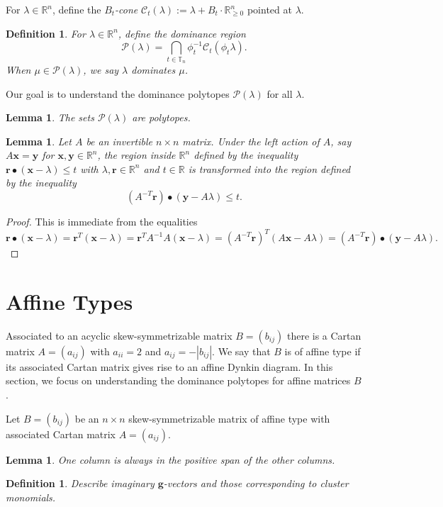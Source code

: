 \documentclass{amsart}
\newtheorem{definition}[theorem]{Definition}
\newtheorem{lemma}[theorem]{Lemma}
\numberwithin{theorem}{section}
\newcommand{\bfg}{\boldsymbol{g}}
\newcommand{\bfr}{\boldsymbol{r}}
\newcommand{\bfx}{\boldsymbol{x}}
\newcommand{\bfy}{\boldsymbol{y}}
\newcommand{\cC}{\mathcal{C}}
\newcommand{\cP}{\mathcal{P}}
\newcommand{\RR}{\mathbb{R}}
\newcommand{\TT}{\mathbb{T}}
\begin{document}
  For $\lambda\in\RR^n$, define the \emph{$B_t$-cone} $\cC_t(\lambda):=\lambda+B_t\cdot\RR_{\ge0}^n$ pointed at $\lambda$.
  \begin{definition}
    For $\lambda\in\RR^n$, define the \emph{dominance region} 
    \[ \cP(\lambda) = \bigcap_{t\in\TT_n} \phi_t^{-1} \cC_t(\phi_t \lambda). \]
    When $\mu\in\cP(\lambda)$, we say \emph{$\lambda$ dominates $\mu$}.
  \end{definition}
  Our goal is to understand the dominance polytopes $\cP(\lambda)$ for all $\lambda$.
  \begin{lemma}
    The sets $\cP(\lambda)$ are polytopes.
  \end{lemma}


  \begin{lemma}
    \label{le:transformed inequalities}
    Let $A$ be an invertible $n\times n$ matrix.
    Under the left action of $A$, say $A\bfx=\bfy$ for $\bfx,\bfy\in\RR^n$, the region inside $\RR^n$ defined by the inequality $\bfr\bullet(\bfx-\lambda)\le t$ with $\lambda,\bfr\in\RR^n$ and $t\in\RR$ is transformed into the region defined by the inequality \[(A^{-T}\bfr)\bullet(\bfy-A\lambda)\le t.\]
  \end{lemma}
  \begin{proof}
    This is immediate from the equalities
    \[\bfr\bullet(\bfx-\lambda)=\bfr^T(\bfx-\lambda)=\bfr^TA^{-1}A(\bfx-\lambda)=(A^{-T}\bfr)^T(A\bfx-A\lambda)=(A^{-T}\bfr)\bullet(\bfy-A\lambda).\]
  \end{proof}


  \section{Affine Types}
  Associated to an acyclic skew-symmetrizable matrix $B=(b_{ij})$ there is a Cartan matrix $A=(a_{ij})$ with $a_{ii}=2$ and $a_{ij}=-|b_{ij}|$.
  We say that $B$ is of affine type if its associated Cartan matrix gives rise to an affine Dynkin diagram.
  In this section, we focus on understanding the dominance polytopes for affine matrices $B$.

  Let $B=(b_{ij})$ be an $n\times n$ skew-symmetrizable matrix of affine type with associated Cartan matrix $A=(a_{ij})$.
  
  \begin{lemma}
    One column is always in the positive span of the other columns.
  \end{lemma}

  \begin{definition}
    Describe imaginary $\bfg$-vectors and those corresponding to cluster monomials.
  \end{definition}
\end{document}
